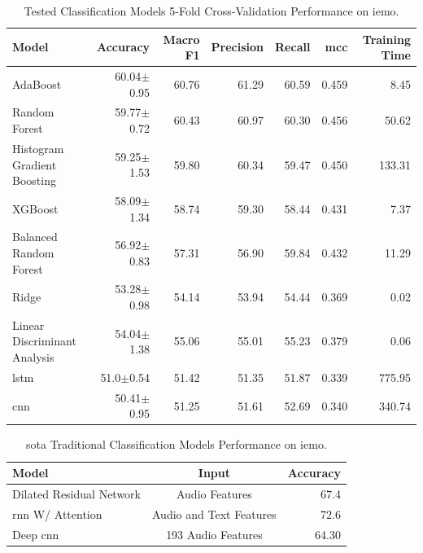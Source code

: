 \begin{table}[H]
	\centering
	\caption{Tested Classification Models 5-Fold Cross-Validation Performance on \ac{iemo}.}
	\label{tab:models}
	\begin{tabular}{lrrrrrr}
		\toprule
		Model & Accuracy & Macro F1 & Precision & Recall & \ac{mcc} & Training Time \\
		\midrule
		
		AdaBoost & 60.04$\pm$0.95 & 60.76 & 61.29 & 60.59 & 0.459 & 8.45  \\
		
		Random Forest & 59.77$\pm$0.72 & 60.43 & 60.97 & 60.30 & 0.456 & 50.62 \\
		
		Histogram Gradient Boosting & 59.25$\pm$1.53 & 59.80 & 60.34 & 59.47 & 0.450 & 133.31  \\
		
		XGBoost & 58.09$\pm$1.34 & 58.74 & 59.30 & 58.44 & 0.431 & 7.37 \\
				
		Balanced Random Forest & 56.92$\pm$0.83 & 57.31 & 56.90 & 59.84 & 0.432 & 11.29  \\
		
		Ridge & 53.28$\pm$0.98 & 54.14 & 53.94 & 54.44 & 0.369 & 0.02 \\
				
		Linear Discriminant Analysis & 54.04$\pm$1.38 & 55.06 & 55.01 & 55.23 & 0.379 & 0.06 \\
		
		\ac{lstm} & 51.0$\pm$0.54 & 51.42 & 51.35 & 51.87 & 0.339 & 775.95 \\
		
		\ac{cnn} & 50.41$\pm$0.95 & 51.25 & 51.61 & 52.69 & 0.340 & 340.74  \\
		
		\bottomrule
	\end{tabular}
\end{table}



\begin{table}[H]
	\centering
	\caption{\ac{sota} Traditional Classification Models Performance on \ac{iemo}.}
	\label{tab:modelssoa}
	\begin{tabular}{lcr}
		\toprule
		Model                        &   Input &   Accuracy \\
		\midrule
		
		Dilated Residual Network \cite{Li_2019}	& Audio Features & 67.4 \\
		
		\ac{rnn} W/ Attention \cite{Lu_2020} & Audio and Text Features & 72.6 \\
		
		Deep \ac{cnn} \cite{Issa_2020} & 193 Audio Features & 64.30 \\
		
		\bottomrule
	\end{tabular}
\end{table}


